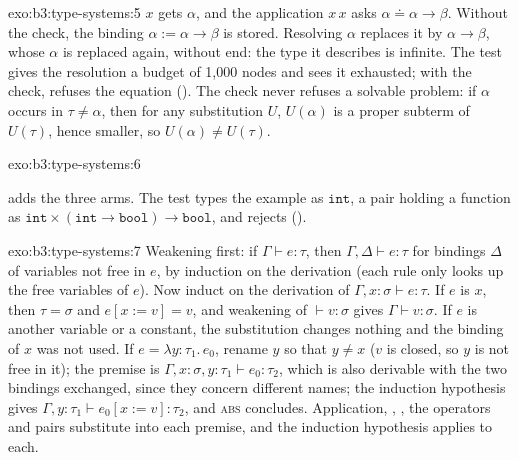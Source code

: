 \begin{solution}{exo:b3:type-systems:5}
$x$ gets $\alpha$, and the application $x\,x$ asks $\alpha \doteq \alpha \to \beta$. Without the check, the binding $\alpha := \alpha \to \beta$ is stored. Resolving $\alpha$ replaces it by $\alpha \to \beta$, whose $\alpha$ is replaced again, without end: the type it describes is infinite. The test gives the resolution a budget of 1,000 nodes and sees it exhausted; with the check,  refuses the equation (). The check never refuses a solvable problem: if $\alpha$ occurs in $\tau \ne \alpha$, then for any substitution $U$, $U(\alpha)$ is a proper subterm of $U(\tau)$, hence smaller, so $U(\alpha) \ne U(\tau)$.
\end{solution}

\begin{solution}{exo:b3:type-systems:6}
\begin{mathpar}


\end{mathpar}
 adds the three arms. The test types the example as $\mathtt{int}$, a pair holding a function as $\mathtt{int} \times (\mathtt{int} \to \mathtt{bool}) \to \mathtt{bool}$, and rejects  ().
\end{solution}

\begin{solution}{exo:b3:type-systems:7}
Weakening first: if $\Gamma \vdash e : \tau$, then $\Gamma, \Delta \vdash e : \tau$ for bindings $\Delta$ of variables not free in $e$, by induction on the derivation (each rule only looks up the free variables of $e$). Now induct on the derivation of $\Gamma, x : \sigma \vdash e : \tau$. If $e$ is $x$, then $\tau = \sigma$ and $e[x := v] = v$, and weakening of $\vdash v : \sigma$ gives $\Gamma \vdash v : \sigma$. If $e$ is another variable or a constant, the substitution changes nothing and the binding of $x$ was not used. If $e = \lambda y{:}\tau_1.\,e_0$, rename $y$ so that $y \ne x$ ($v$ is closed, so $y$ is not free in it); the premise is $\Gamma, x : \sigma, y : \tau_1 \vdash e_0 : \tau_2$, which is also derivable with the two bindings exchanged, since they concern different names; the induction hypothesis gives $\Gamma, y : \tau_1 \vdash e_0[x := v] : \tau_2$, and \textsc{abs} concludes. Application, , , the operators and pairs substitute into each premise, and the induction hypothesis applies to each.
\end{solution}

